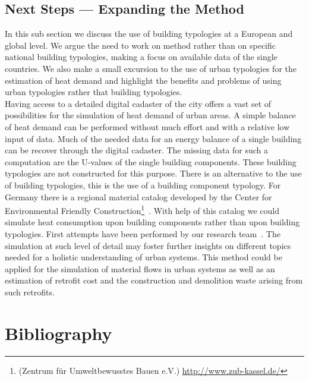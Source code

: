 \documentclass[authoryear,preprint,review,12pt]{elsarticle}
\begin{document}
\begin{linenumbers}
\subsection{Next Steps --- Expanding the Method}\label{sub-section:next}

In this sub section we discuss the use of building typologies at a European
and global level. We argue the need to work on method rather than on specific
national building typologies, making a focus on available data of the single
countries.  We also make a small excursion to the use of urban typologies for
the estimation of heat demand and highlight the benefits and problems of using
urban typologies rather that building typologies.\\

Having access to a detailed digital cadaster of the city offers a vast set of
possibilities for the simulation of heat demand of urban areas.  A simple
balance of heat demand can be performed without much effort and with a relative
low input of data.  Much of the needed data for an energy balance of a single
building can be recover through the digital cadaster.  The missing data for
such a computation are the U-values of the single building components.  These
building typologies are not constructed for this purpose.  There is an
alternative to the use of building typologies, this is the use of a building
component typology.  For Germany there is a regional material catalog developed
by the Center for Environmental Friendly Construction\footnote{(Zentrum für
    Umweltbewusstes Bauen e.V.)
    \url{http://www.zub-kassel.de/}}~\cite{Klauss.2009}.
With help of this catalog we could simulate heat consumption upon building
components rather than upon building typologies.  First attempts have been
performed by our research team~\cite{Munoz.2014c}. The simulation at such level of
detail may foster further insights on different topics needed for a holistic
understanding of urban systems.  This method could be applied for the
simulation of material flows in urban systems as well as an estimation of
retrofit cost and the construction and demolition waste arising from such
retrofits.\\


\section*{Bibliography}
% 
%

%

\end{linenumbers}
\end{document}

